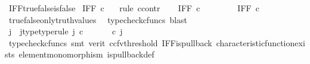 \begin{isabellebody}
\isamarkupfalse%
%
\endisatagproof
{\isafoldproof}%
%
\isadelimproof
\isanewline
%
\endisadelimproof
\isanewline
{}\isamarkupfalse%
\ IFF{\isacharunderscore}{\kern0pt}true{\isacharunderscore}{\kern0pt}false{\isacharunderscore}{\kern0pt}is{\isacharunderscore}{\kern0pt}false{\isacharcolon}{\kern0pt}\isanewline
\ {\isachardoublequoteopen}IFF\ {\isasymcirc}\isactrlsub c\ {\isasymlangle}{\isasymt}{\isacharcomma}{\kern0pt}{\isasymf}{\isasymrangle}\ {\isacharequal}{\kern0pt}\ {\isasymf}{\isachardoublequoteclose}\isanewline
%
\isadelimproof
%
\endisadelimproof
%
\isatagproof
{}\isamarkupfalse%
{\isacharparenleft}{\kern0pt}rule\ ccontr{\isacharparenright}{\kern0pt}\isanewline
\ \ \isamarkupfalse%
\ {\isachardoublequoteopen}IFF\ {\isasymcirc}\isactrlsub c\ {\isasymlangle}{\isasymt}{\isacharcomma}{\kern0pt}{\isasymf}{\isasymrangle}\ {\isasymnoteq}\ {\isasymf}{\isachardoublequoteclose}\isanewline
\ \ \isamarkupfalse%
\ \isamarkupfalse%
\ {\isachardoublequoteopen}IFF\ {\isasymcirc}\isactrlsub c\ {\isasymlangle}{\isasymt}{\isacharcomma}{\kern0pt}{\isasymf}{\isasymrangle}\ \ {\isacharequal}{\kern0pt}\ {\isasymt}{\isachardoublequoteclose}\isanewline
\ \ \ \ \isamarkupfalse%
\ true{\isacharunderscore}{\kern0pt}false{\isacharunderscore}{\kern0pt}only{\isacharunderscore}{\kern0pt}truth{\isacharunderscore}{\kern0pt}values\ \isamarkupfalse%
\ {\isacharparenleft}{\kern0pt}typecheck{\isacharunderscore}{\kern0pt}cfuncs{\isacharcomma}{\kern0pt}\ blast{\isacharparenright}{\kern0pt}\ \ \ \ \isanewline
\ \ \isamarkupfalse%
\ \isamarkupfalse%
\ j\ \ j{\isacharunderscore}{\kern0pt}type{\isacharbrackleft}{\kern0pt}type{\isacharunderscore}{\kern0pt}rule{\isacharbrackright}{\kern0pt}{\isacharcolon}{\kern0pt}\ {\isachardoublequoteopen}j\ {\isasymin}\isactrlsub c\ {\isasymone}{\isasymCoprod}{\isasymone}\ {\isasymand}\ {\isacharparenleft}{\kern0pt}{\isasymlangle}{\isasymt}{\isacharcomma}{\kern0pt}\ {\isasymt}{\isasymrangle}\ {\isasymamalg}{\isasymlangle}{\isasymf}{\isacharcomma}{\kern0pt}\ {\isasymf}{\isasymrangle}{\isacharparenright}{\kern0pt}\ {\isasymcirc}\isactrlsub c\ j\ \ {\isacharequal}{\kern0pt}\ {\isasymlangle}{\isasymt}{\isacharcomma}{\kern0pt}{\isasymf}{\isasymrangle}{\isachardoublequoteclose}\isanewline
\ \ \ \ \isamarkupfalse%
\ {\isacharparenleft}{\kern0pt}typecheck{\isacharunderscore}{\kern0pt}cfuncs{\isacharcomma}{\kern0pt}\ smt\ {\isacharparenleft}{\kern0pt}verit{\isacharcomma}{\kern0pt}\ ccfv{\isacharunderscore}{\kern0pt}threshold{\isacharparenright}{\kern0pt}\ IFF{\isacharunderscore}{\kern0pt}is{\isacharunderscore}{\kern0pt}pullback\ characteristic{\isacharunderscore}{\kern0pt}function{\isacharunderscore}{\kern0pt}exists\ element{\isacharunderscore}{\kern0pt}monomorphism\ is{\isacharunderscore}{\kern0pt}pullback{\isacharunderscore}{\kern0pt}def{\isacharparenright}{\kern0pt}\isanewline

\end{isabellebody}
